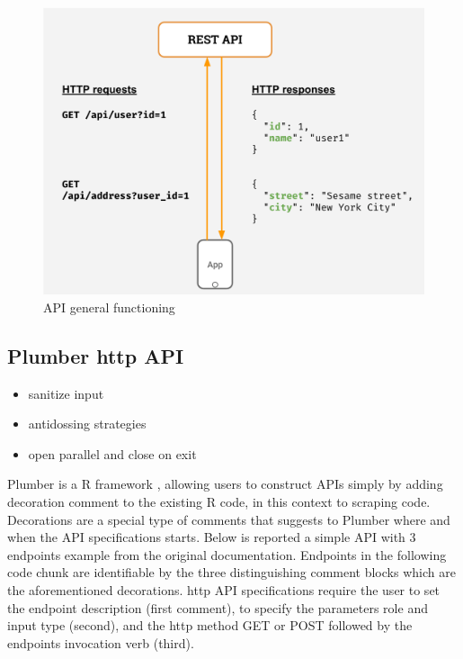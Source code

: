 \documentclass[
  12pt,
  a4paper,
  oneside]{book}
\providecommand{\tightlist}{%
  \setlength{\itemsep}{0pt}\setlength{\parskip}{0pt}}
\theoremstyle{definition}
\theoremstyle{definition}
\theoremstyle{definition}
\theoremstyle{remark}
\begin{document}
\begin{figure}
\centering
\includegraphics{images/Rest-API.png}
\caption{\label{fig:apigenstru}API general functioning}
\end{figure}

\hypertarget{plumberapi}{%
\subsection{Plumber http API}\label{plumberapi}}

\begin{itemize}
\tightlist
\item
  sanitize input
\item
  antidossing strategies
\item
  open parallel and close on exit
\end{itemize}

Plumber is a R framework \citep{an_api_generator_for_r}, allowing users to construct APIs simply by adding decoration comment to the existing R code, in this context to scraping code. Decorations are a special type of comments that suggests to Plumber where and when the API specifications starts. Below is reported a simple API with 3 endpoints example from the original documentation. Endpoints in the following code chunk are identifiable by the three distinguishing comment blocks which are the aforementioned decorations. http API specifications require the user to set the endpoint description (first comment), to specify the parameters role and input type (second), and the http method GET or POST followed by the endpoints invocation verb (third).
\end{document}
